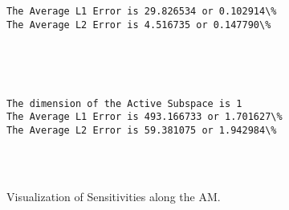 \documentclass[11pt]{article}
\begin{document}
    \begin{Verbatim}[commandchars=\\\{\}]
The Average L1 Error is 29.826534 or 0.102914\%
The Average L2 Error is 4.516735 or 0.147790\%

    \end{Verbatim}

    \begin{center}
    \end{center}
    { \hspace*{\fill} \\}
    
    \begin{center}
    \end{center}
    { \hspace*{\fill} \\}
    
    \begin{Verbatim}[commandchars=\\\{\}]
The dimension of the Active Subspace is 1
The Average L1 Error is 493.166733 or 1.701627\%
The Average L2 Error is 59.381075 or 1.942984\%


    \end{Verbatim}

    \begin{center}
    \end{center}
    { \hspace*{\fill} \\}
    
    Visualization of Sensitivities along the AM.
\end{document}
